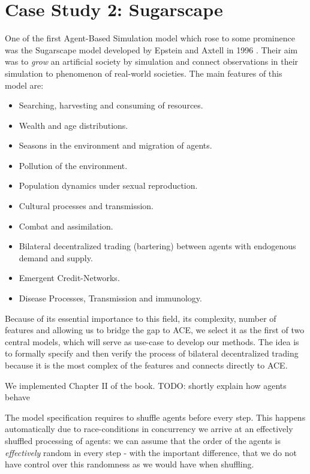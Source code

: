 \section{Case Study 2: Sugarscape}
One of the first  Agent-Based Simulation model which rose to some prominence was the Sugarscape model developed by Epstein and Axtell in 1996 \cite{epstein_growing_1996}. Their aim was to \textit{grow} an artificial society by simulation and connect observations in their simulation to phenomenon of real-world societies. The main features of this model are:

\begin{itemize}
	\item Searching, harvesting and consuming of resources.
	\item Wealth and age distributions.
	\item Seasons in the environment and migration of agents.
	\item Pollution of the environment.
	\item Population dynamics under sexual reproduction.
	\item Cultural processes and transmission.
	\item Combat and assimilation.
	\item Bilateral decentralized trading (bartering) between agents with endogenous demand and supply.
	\item Emergent Credit-Networks.
	\item Disease Processes, Transmission and immunology.
\end{itemize}

Because of its essential importance to this field, its complexity, number of features and allowing us to bridge the gap to ACE, we select it as the first of two central models, which will serve as use-case to develop our methods. The idea is to formally specify and then verify the process of bilateral decentralized trading because it is the most complex of the features and connects directly to ACE.

We implemented Chapter II of the book. TODO: shortly explain how agents behave

The model specification requires to shuffle agents before every step. This happens automatically due to race-conditions in concurrency we arrive at an effectively shuffled processing of agents: we can assume that the order of the agents is \textit{effectively} random in every step - with the important difference, that we do not have control over this randomness as we would have when shuffling.

